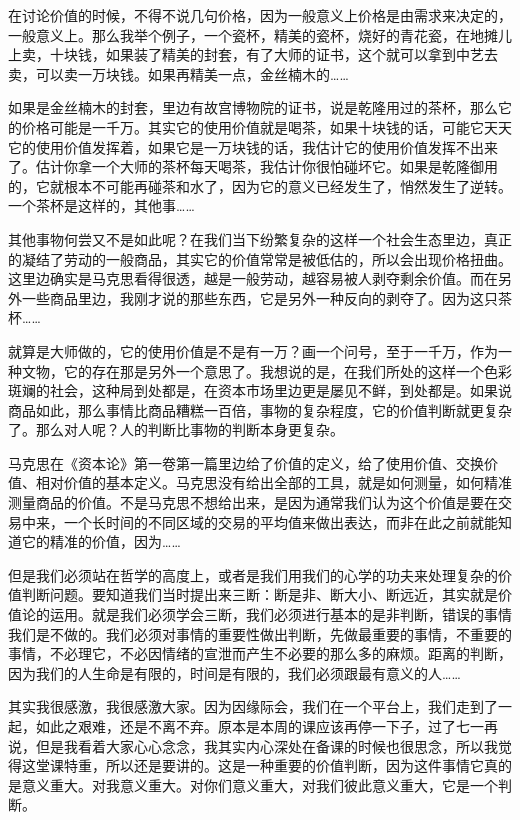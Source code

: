 \documentclass[UTF8, 12pt, a4paper]{ctexrep}
\begin{document}
在讨论价值的时候，不得不说几句价格，因为一般意义上价格是由需求来决定的，一般意义上。那么我举个例子，一个瓷杯，精美的瓷杯，烧好的青花瓷，在地摊儿上卖，十块钱，如果装了精美的封套，有了大师的证书，这个就可以拿到中艺去卖，可以卖一万块钱。如果再精美一点，金丝楠木的……

如果是金丝楠木的封套，里边有故宫博物院的证书，说是乾隆用过的茶杯，那么它的价格可能是一千万。其实它的使用价值就是喝茶，如果十块钱的话，可能它天天它的使用价值发挥着，如果它是一万块钱的话，我估计它的使用价值发挥不出来了。估计你拿一个大师的茶杯每天喝茶，我估计你很怕碰坏它。如果是乾隆御用的，它就根本不可能再碰茶和水了，因为它的意义已经发生了，悄然发生了逆转。一个茶杯是这样的，其他事……

其他事物何尝又不是如此呢？在我们当下纷繁复杂的这样一个社会生态里边，真正的凝结了劳动的一般商品，其实它的价值常常是被低估的，所以会出现价格扭曲。这里边确实是马克思看得很透，越是一般劳动，越容易被人剥夺剩余价值。而在另外一些商品里边，我刚才说的那些东西，它是另外一种反向的剥夺了。因为这只茶杯……

就算是大师做的，它的使用价值是不是有一万？画一个问号，至于一千万，作为一种文物，它的存在那是另外一个意思了。我想说的是，在我们所处的这样一个色彩斑斓的社会，这种局到处都是，在资本市场里边更是屡见不鲜，到处都是。如果说商品如此，那么事情比商品糟糕一百倍，事物的复杂程度，它的价值判断就更复杂了。那么对人呢？人的判断比事物的判断本身更复杂。

马克思在《资本论》第一卷第一篇里边给了价值的定义，给了使用价值、交换价值、相对价值的基本定义。马克思没有给出全部的工具，就是如何测量，如何精准测量商品的价值。不是马克思不想给出来，是因为通常我们认为这个价值是要在交易中来，一个长时间的不同区域的交易的平均值来做出表达，而非在此之前就能知道它的精准的价值，因为……

但是我们必须站在哲学的高度上，或者是我们用我们的心学的功夫来处理复杂的价值判断问题。要知道我们当时提出来三断：断是非、断大小、断远近，其实就是价值论的运用。就是我们必须学会三断，我们必须进行基本的是非判断，错误的事情我们是不做的。我们必须对事情的重要性做出判断，先做最重要的事情，不重要的事情，不必理它，不必因情绪的宣泄而产生不必要的那么多的麻烦。距离的判断，因为我们的人生命是有限的，时间是有限的，我们必须跟最有意义的人……

其实我很感激，我很感激大家。因为因缘际会，我们在一个平台上，我们走到了一起，如此之艰难，还是不离不弃。原本是本周的课应该再停一下子，过了七一再说，但是我看着大家心心念念，我其实内心深处在备课的时候也很思念，所以我觉得这堂课特重，所以还是要讲的。这是一种重要的价值判断，因为这件事情它真的是意义重大。对我意义重大。对你们意义重大，对我们彼此意义重大，它是一个判断。
\end{document}
